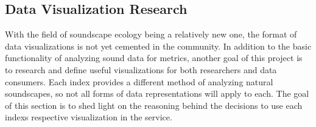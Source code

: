 \subsection{Data Visualization Research}
With the field of soundscape ecology being a relatively new one, the format of data visualizations is not yet cemented in the community. In addition to the basic functionality of analyzing sound data for metrics, another goal of this project is to research and define useful visualizations for both researchers and data consumers. Each index provides a different method of analyzing natural soundscapes, so not all forms of data representations will apply to each. The goal of this section is to shed light on the reasoning behind the decisions to use each index\textquotesingle s respective visualization in the service.







